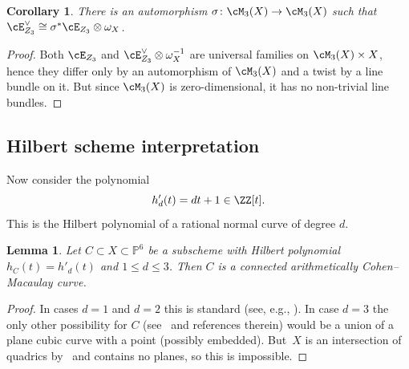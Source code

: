 \documentclass[11pt]{amsart}
\renewcommand{\P}{{\mathbb{P}}}
\theoremstyle{plain}
\newtheorem{lemma}[theorem]{Lemma}
\newtheorem{corollary}[theorem]{Corollary}
\theoremstyle{definition}
\theoremstyle{remark}
\begin{document}
\begin{corollary}\label{corollary:tau-m3x}
There is an automorphism $\sigma \colon \cM_3(X) \to \cM_3(X)$ such that $\cE_{Z_3}^\vee \cong \sigma^*\cE_{Z_3} \otimes \omega_X$.
\end{corollary}
\begin{proof}
Both $\cE_{Z_3}$ and $\cE_{Z_3}^\vee \otimes \omega_X^{-1}$ are universal families on $\cM_3(X) \times X$, hence they differ only by an automorphism of $\cM_3(X)$ and a twist by a line bundle on it.
But since $\cM_3(X)$ is zero-dimensional, it has no non-trivial line bundles.
\end{proof}



\subsection{Hilbert scheme interpretation}\label{subsection:hilbert}

Now consider the polynomial 
\begin{equation}\label{eq:hdprime}
h'_d(t) = dt + 1 \in \ZZ[t].
\end{equation} 
This is the Hilbert polynomial of a rational normal curve of degree $d$.

\begin{lemma}
Let $C \subset X \subset \P^6$ be a subscheme with Hilbert polynomial $h_C(t) = h'_d(t)$ and $1 \le d \le 3$.
Then $C$ is a connected arithmetically Cohen--Macaulay curve.
\end{lemma}
\begin{proof}
In cases $d = 1$ and $d = 2$ this is standard (see, e.g., \cite[Lemma~2.1.1]{kuznetsov2016hilbert}).
In case $d = 3$ the only other possibility for $C$ (see~\cite[\S1]{lehn2015twisted} and references therein) would be a union of a plane cubic curve with a point (possibly embedded).
But~$X$ is an intersection of quadrics by~\cite[Theorem~4.4]{hidaka1981normal} and contains no planes, so this is impossible.
\end{proof}
\end{document}
